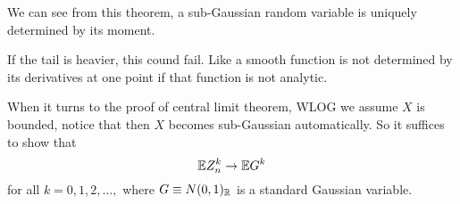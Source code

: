 We can see from this theorem, a sub-Gaussian random variable is uniquely determined by its moment. 

If the tail is heavier, this cound fail. Like a smooth function is not determined by its derivatives at one point if that function is not analytic. 

When it turns to the proof of central limit theorem, WLOG we assume $X$ is bounded, notice that then $X$ becomes sub-Gaussian automatically. 
So it suffices to show that 
\begin{equation*}
    \mathbb{E} Z_n^k \to \mathbb{E} G^k
\end{equation*}
for all $k=0,1,2,\dots,$ where $G\equiv N(0,1)_{\mathbb{R}}$  is a standard Gaussian variable.





